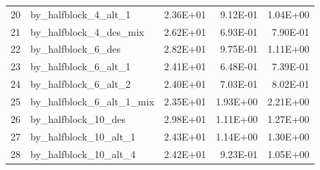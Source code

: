 \documentclass[11pt]{article}
\begin{document}
\begin{table}[htbp]
\begin{tabular}{rlrrr}
    20    & by\_halfblock\_4\_alt\_1 & 2.36E+01 & 9.12E-01 & 1.04E+00 \\
    21    & by\_halfblock\_4\_des\_mix & 2.62E+01 & 6.93E-01 & 7.90E-01 \\
    22    & by\_halfblock\_6\_des & 2.82E+01 & 9.75E-01 & 1.11E+00 \\
    23    & by\_halfblock\_6\_alt\_1 & 2.41E+01 & 6.48E-01 & 7.39E-01 \\
    24    & by\_halfblock\_6\_alt\_2 & 2.40E+01 & 7.03E-01 & 8.02E-01 \\
    25    & by\_halfblock\_6\_alt\_1\_mix & 2.35E+01 & 1.93E+00 & 2.21E+00 \\
    26    & by\_halfblock\_10\_des & 2.98E+01 & 1.11E+00 & 1.27E+00 \\
    27    & by\_halfblock\_10\_alt\_1 & 2.43E+01 & 1.14E+00 & 1.30E+00 \\
    28    & by\_halfblock\_10\_alt\_4 & 2.42E+01 & 9.23E-01 & 1.05E+00 \\

\end{tabular}
\end{table}
\end{document}

